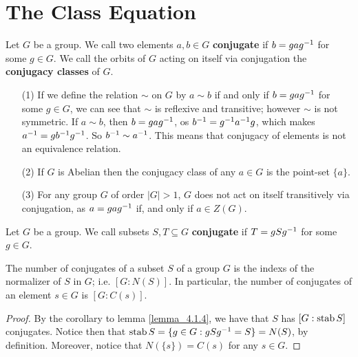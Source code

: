 \section{The Class Equation}
\label{section_4.3}

\begin{definition}
  Let $G$ be a group. We call two elements  $a,b \in G$ \textbf{conjugate} if
  $b=gag^{-1}$ for some $g \in G$. We call the orbits of $G$ acting on itself
  via conjugation the \textbf{conjugacy classes} of $G$.
\end{definition}

\begin{example}\label{example_4.7}
  \begin{enumerate}
    \item[(1)] If we define the relation $\sim$ on $G$ by $a \sim b$ if and
      only if  $b=gag^{-1}$ for some $g \in G$, we can see that  $\sim$
      is reflexive and transitive; however  $\sim$ is not symmetric. If $a
      \sim b$, then  $b=gag^{-1}$, os $b^{-1}=g^{-1}a^{-1}g$, which
      makes $a^{-1}=gb^{-1}g^{-1}$. So $b^{-1} \sim a^{-1}$. This
      means that conjugacy of elements is not an equivalence relation.

    \item[(2)] If $G$ is Abelian then the conjugacy class of any $a \in G$
      is the point-set $\{a\}$.

    \item[(3)] For any group $G$ of order  $|G|>1$, $G$ does not act on
      itself transitively via conjugation, as  $a=gag^{-1}$ if, and only
      if $a \in Z(G)$.
  \end{enumerate}
\end{example}

\begin{definition}
  Let $G$ be a group. We call subsets  $S,T \subseteq G$  \textbf{conjugate}
  if $T=gSg^{-1}$ for some $g \in G$.
\end{definition}

\begin{lemma}\label{lemma_4.3.1}
  The number of conjugates of a subset $S$ of a group  $G$ is the indexs of
  the normalizer of $S$ in $G$; i.e.  $[G:N(S)]$. In particular, the number of
  conjugates of an element $s \in G$ is  $[G:C(s)]$.
\end{lemma}
\begin{proof}
  By the corollary to lemma \ref{lemma_4.1.4}, we have that $S$ has  $[G:\operatorname{stab}{S}]$
  conjugates. Notice then that $\operatorname{stab}{S}=\{g \in G : gSg^{-1}=S\}=N(S)$, by
  definition. Moreover, notice that $N(\{s\})=C(s)$ for any $s \in G$.
\end{proof}


